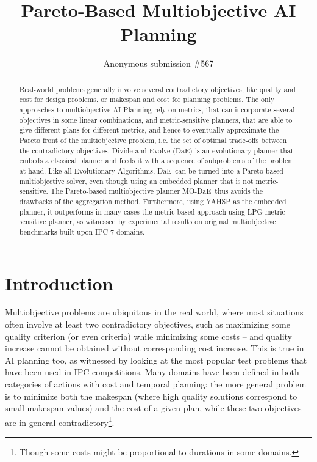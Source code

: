 \documentclass{article}
\title{Pareto-Based Multiobjective AI Planning}
\author{Anonymous submission \#567}
\def\DAE{{\sc DaE}}
\def\MODAE{{\sc MO-DaE}}
\begin{document}
\maketitle

\begin{abstract}
Real-world problems generally involve several contradictory objectives, like quality and cost for design problems, or makespan and cost for planning problems. The only approaches to multiobjective AI Planning rely on metrics, that can incorporate several objectives in some linear combinations, and metric-sensitive planners, that are able to give different plans for different metrics, and hence to eventually approximate the Pareto front of the multiobjective problem, i.e. the set of optimal trade-offs between the contradictory objectives. Divide-and-Evolve (\DAE) is an evolutionary planner that embeds a classical planner and feeds it with a sequence of subproblems of the problem at hand. Like all Evolutionary Algorithms, \DAE\ can be turned into a Pareto-based multiobjective solver, even though using an embedded planner that is not metric-sensitive. The Pareto-based multiobjective planner \MODAE\ thus avoids the drawbacks of the aggregation method. Furthermore, using YAHSP as the embedded planner, it outperforms 
in many cases the metric-based approach using LPG metric-sensitive planner, as witnessed by experimental results on original multiobjective benchmarks built upon IPC-7 domains.
\end{abstract}

\section{Introduction}

Multiobjective problems are ubiquitous in the real world, where most situations often involve at least two contradictory objectives, such as maximizing some quality criterion (or even criteria) while minimizing some costs --  and quality increase cannot be obtained without corresponding cost increase. This is true in AI planning too, as witnessed by looking at the most popular test problems that have been used in IPC competitions. Many domains have been defined in both categories of actions with cost and temporal planning: the more general problem is to minimize both the makespan (where high quality solutions correspond to small makespan values) and the cost of a given plan, while these two objectives are in general contradictory\footnote{Though some costs might be proportional to durations in some domains.}. 
\end{document}
